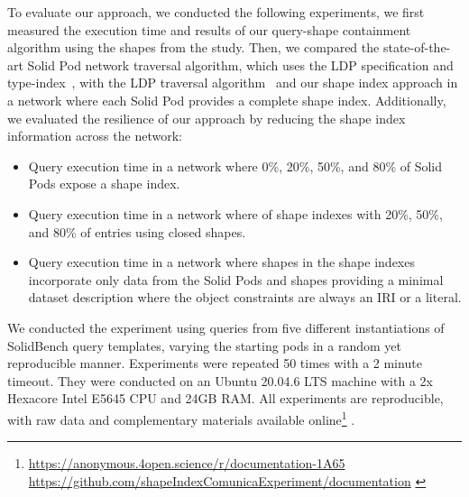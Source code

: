 To evaluate our approach, we conducted the following experiments, we first measured the execution time and results of our query-shape containment algorithm using the shapes from the study.
Then, we compared the state-of-the-art Solid Pod network traversal algorithm, which uses the LDP specification and type-index~\cite{Taelman2023}, with the LDP traversal algorithm~\cite{Taelman2023} and our shape index approach in a network where each Solid Pod provides a complete shape index.
Additionally, we evaluated the resilience of our approach by reducing the shape index information across the network:
\begin{itemize}
   \item Query execution time in a network where 0\%, 20\%, 50\%, and 80\% of Solid Pods expose a shape index.
   \item Query execution time in a network where of shape indexes with 20\%, 50\%, and 80\% of entries using closed shapes.
   \item Query execution time in a network where shapes in the shape indexes incorporate only data from the Solid Pods and shapes providing a minimal dataset description where the object constraints are always an IRI or a literal.%
\end{itemize}
We conducted the experiment using queries from five different instantiations of SolidBench query templates, varying the starting pods in a random yet reproducible manner.
Experiments were repeated 50 times with a 2 minute timeout. 
They were conducted on an Ubuntu 20.04.6 LTS machine with a 2x Hexacore Intel E5645 CPU and 24GB RAM.
All experiments are reproducible, with raw data and complementary materials available online\footnote{
\ifanonymous
   \url{https://anonymous.4open.science/r/documentation-1A65}
\else
   \url{https://github.com/shapeIndexComunicaExperiment/documentation}
\fi 
\label{sf:complementaryMaterial}} .

